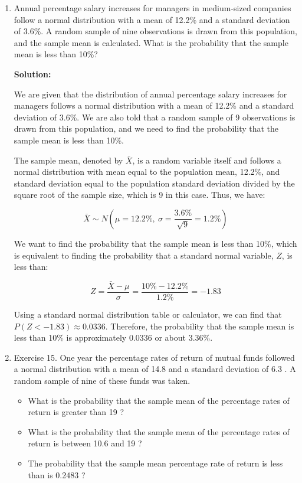 \documentclass[12pt]{article}
\begin{document}
\begin{enumerate}
{Let $Z_k$ be the Z-score corresponding to $k$. Then:
\[ P(Z < Z_k) = P(X < k) \]

Solving for $k$ using the CDF of the standard normal distribution, we find:
\[ k = \sigma \cdot Z_k + \mu \]

Substituting the values:
\[ k \approx 10 \cdot Z_k + 66 \]

Given the calculated cumulative probability up to $k$, we find $k \approx 66.60$.

}

\item   Annual percentage salary increases for managers in medium-sized companies follow a normal distribution with a mean of 12.2\% and a standard deviation of 3.6\%. A random sample of nine observations is drawn from this population, and the sample mean is calculated. What is the probability that the sample mean is less than 10\%?

{\color{blue}
\noindent \textbf{Solution:}

We are given that the distribution of annual percentage salary increases for managers follows a normal distribution with a mean of 12.2\% and a standard deviation of 3.6\%. We are also told that a random sample of 9 observations is drawn from this population, and we need to find the probability that the sample mean is less than 10\%.

The sample mean, denoted by $\bar{X}$, is a random variable itself and follows a normal distribution with mean equal to the population mean, 12.2\%, and standard deviation equal to the population standard deviation divided by the square root of the sample size, which is 9 in this case. Thus, we have:

$$\bar{X} \sim N\left(\mu = 12.2\%,\ \sigma = \frac{3.6\%}{\sqrt{9}} = 1.2\%\right)$$

We want to find the probability that the sample mean is less than 10\%, which is equivalent to finding the probability that a standard normal variable, $Z$, is less than:

$$Z = \frac{\bar{X} - \mu}{\sigma} = \frac{10\% - 12.2\%}{1.2\%} = -1.83$$
	
Using a standard normal distribution table or calculator, we can find that $P(Z < -1.83) \approx 0.0336$. Therefore, the probability that the sample mean is less than 10\% is approximately 0.0336 or about 3.36\%.

}

\item   Exercise 15. One year the percentage rates of return of mutual funds followed a normal distribution with a mean of 14.8 and a standard deviation of 6.3 . A random sample of nine of these funds was taken.
\begin{itemize}
    \item What is the probability that the sample mean of the percentage rates of return is greater than 19 ?
    \item What is the probability that the sample mean of the percentage rates of return is between 10.6 and 19 ?
    \item  The probability that the sample mean percentage rate of return is less than is 0.2483 ?
\end{itemize}



\end{enumerate}
\end{document}
